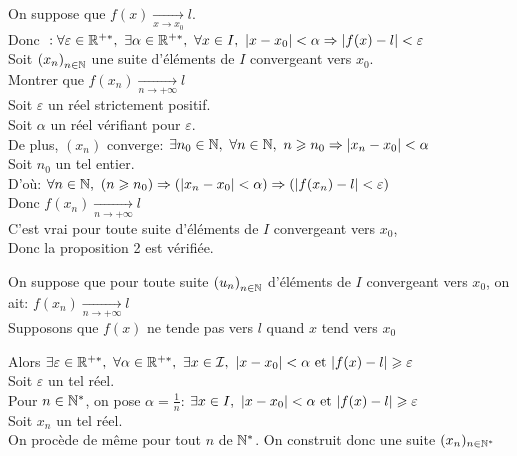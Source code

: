 \documentclass[12pt,twoside,a4paper]{article}
\begin{document}
		\begin{preuve}
			\begin{liste}
				\item On suppose que $f(x)\mathop{\longrightarrow}\limits_{x\rightarrow x_0} l$.\\
					Donc $\ :\forall \varepsilon \in\R^{+*},\ \exists\alpha\in\R^{+*},\ \forall x\in I,\ |x-x_0|<\alpha\Rightarrow |f(x)-l|<\varepsilon$\\
					Soit $\left( x_n\right) _{n\in\mathbb{N}}$ une suite d'\'el\'ements de $I$ convergeant vers $x_0$.\\
					Montrer que $f\left( x_n\right) \mathop{\longrightarrow}\limits_{n\rightarrow +\infty}l$\\
					Soit $\varepsilon$ un r\'eel strictement positif.\\
					Soit $\alpha$ un r\'eel v\'erifiant  pour $\varepsilon$.\\
					De plus, $\left( x_n\right) $ converge: $\exists n_0\in\N,\ \forall n\in\N,\ n\geqslant n_0\Rightarrow \left| x_n-x_0\right| <\alpha$\\
					Soit $n_0$ un tel entier.\\
					D'o\`u: $\forall n\in\mathbb{N},\ (n\geqslant n_0)\Rightarrow (\left| x_n-x_0\right| <\alpha) \Rightarrow (|f(x_n)-l|<\varepsilon)$\\
					Donc $f\left( x_n\right) \mathop{\longrightarrow}\limits_{n\rightarrow +\infty}l$\\
					C'est vrai pour toute suite d'\'el\'ements de $I$ convergeant vers $x_0$,\\
					Donc la proposition 2 est v\'erifi\'ee.
				\item On suppose que pour toute suite $\left(u_n \right)_{n\in\mathbb{N}}$ d'\'el\'ements de $I$ convergeant vers $x_0$, on ait: $f\left( x_n\right) \mathop{\longrightarrow}\limits_{n\rightarrow +\infty}l$\\
				 Supposons que $f(x)$ ne tende pas vers $l$ quand $x$ tend vers $x_0$
				\begin{tab}
					Alors $\exists \varepsilon\in\R^{+*},\ \forall \alpha\in\R^{+*},\ \exists x\in\I,\ |x-x_0|<\alpha\et|f(x)-l|\geqslant\varepsilon$\\
					Soit $\varepsilon$ un tel r\'eel.\\
					Pour $n\in\mathbb{N}^{*}$, on pose $\alpha=\frac{1}{n}$: $\exists x\in I,\ |x-x_0|<\alpha\et|f(x)-l|\geqslant\varepsilon$\\
					Soit $x_n$ un tel r\'eel.\\
					On proc\`ede de m\^eme pour tout $n$ de $\mathbb{N}^{*}$. On construit donc une suite $(x_n)_{n\in\mathbb{N}^{*}}$\\

\end{tab}
\end{liste}
\end{preuve}
\end{document}
